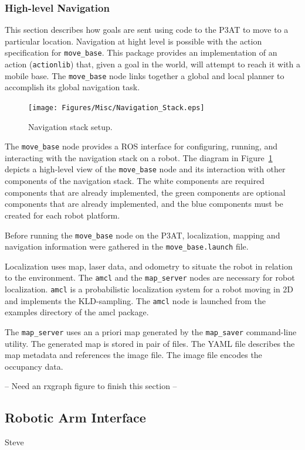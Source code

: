 \subsubsection*{High-level Navigation}
This section describes how goals are sent using code to the P3AT to move to a particular location. Navigation at hight level is possible with the action specification for \texttt{move\_base}. This package provides an implementation of an action (\texttt{actionlib}) that, given a goal in the world, will attempt to reach it with a mobile base. The \texttt{move\_base} node links together a global and local planner to accomplish its global navigation task. 

\begin{figure}[h!]
\centering
\texttt{[image: Figures/Misc/Navigation\_Stack.eps]}
\caption{Navigation stack setup.}\label{fig:navigation_stack}
\end{figure}
The \texttt{move\_base} node provides a ROS interface for configuring, running, and interacting with the navigation stack on a robot. The diagram in Figure~\ref{fig:navigation_stack} depicts a high-level view of the \texttt{move\_base} node and its interaction with other components of the navigation stack. The white components are required components that are already implemented, the green components are optional components that are already implemented, and the blue components must be created for each robot platform. 

 Before running the \texttt{move\_base} node on the P3AT, localization, mapping and navigation information were gathered in the \texttt{move\_base.launch} file.

Localization uses map, laser data, and odometry to situate the robot in relation to the environment. The \texttt{amcl} and the \texttt{map\_server} nodes are necessary for robot localization. \texttt{amcl} is a probabilistic localization system for a robot moving in 2D and implements the KLD-sampling\cite{DIETER.IJRS.2003}. The \texttt{amcl} node is launched from the
examples directory of the amcl package.

The \texttt{map\_server} uses an a priori map generated by the \texttt{map\_saver} command-line utility. The generated map is stored in pair of files. The YAML file describes the map metadata and references the image file. The image file encodes the occupancy data. 

-- Need an rxgraph figure to finish this section --

\subsection*{Robotic Arm Interface}
Steve
